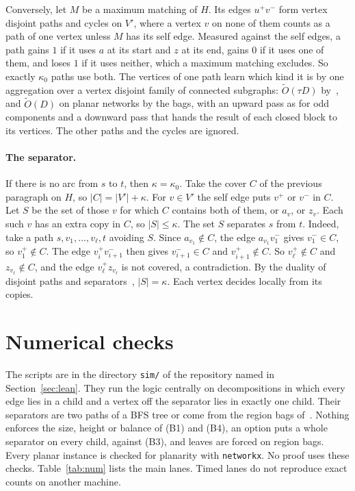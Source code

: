 \documentclass[11pt]{article}
\theoremstyle{definition}
\theoremstyle{remark}
\theoremstyle{plain}
\newcommand{\Ot}{\tilde O}
\begin{document}
Conversely, let $M$ be a maximum matching of $H$. Its edges $u^+v^-$ form vertex disjoint paths and cycles on $V'$, where a vertex $v$ on none of them counts as a path of one vertex unless $M$ has its self edge. Measured against the self edges, a path gains
$1$ if it uses $a$ at its start and $z$ at its end, gains $0$ if it uses one of them, and loses $1$ if it uses neither, which a maximum matching excludes. So exactly $\kappa_0$ paths use both. The vertices of one path learn which kind it is by one aggregation over a
vertex disjoint family of connected subgraphs: $\Ot(\tau D)$ by~\cite[Lemma 8]{IKNS22}, and $\Ot(D)$ on planar networks by the bags, with an upward pass as for odd components and a downward pass that hands the result of each closed block to its vertices. The
other paths and the cycles are ignored.

\paragraph{The separator.} If there is no arc from $s$ to $t$, then $\kappa=\kappa_0$. Take the cover $C$ of the previous paragraph on $H$, so $|C|=|V'|+\kappa$. For $v\in V'$ the self edge puts $v^+$ or $v^-$ in $C$. Let $S$ be the set of those $v$ for which $C$ contains both
of them, or $a_v$, or $z_v$. Each such $v$ has an extra copy in $C$, so $|S|\le\kappa$. The set $S$ separates $s$ from $t$. Indeed, take a path $s,v_1,\dots,v_\ell,t$ avoiding $S$. Since $a_{v_1}\notin C$, the edge $a_{v_1}v_1^-$ gives $v_1^-\in C$, so $v_1^+\notin C$. The
edge $v_i^+v_{i+1}^-$ then gives $v_{i+1}^-\in C$ and $v_{i+1}^+\notin C$. So $v_\ell^+\notin C$ and $z_{v_\ell}\notin C$, and the edge $v_\ell^+z_{v_\ell}$ is not covered, a contradiction. By the duality of disjoint paths and separators~\cite{LoP86}, $|S|=\kappa$. Each vertex decides locally from its copies.

\section{Numerical checks}\label{sec:numerics}

The scripts are in the directory \texttt{sim/} of the repository named in Section~\ref{sec:lean}. They run the logic centrally on decompositions in which every edge lies in a child and a vertex off the separator lies in
exactly one child. Their separators are two paths of a BFS tree or come from the region bags of~\cite{S26}. Nothing enforces the
size, height or balance of (B1) and (B4), an option puts a whole separator on every child, against (B3), and leaves are forced on region bags. Every planar instance is checked for planarity with \texttt{networkx}. No proof uses these checks. Table~\ref{tab:num} lists the main lanes. Timed lanes do not reproduce exact counts on another machine.
\end{document}
